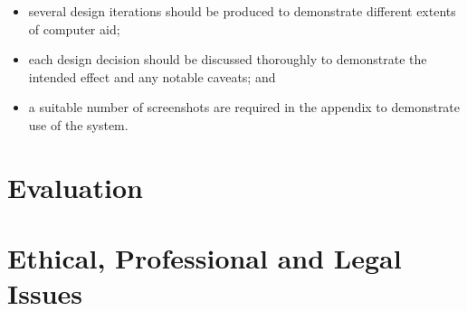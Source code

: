 \begin{itemize}
        \item several design iterations should be produced to demonstrate different extents of computer aid;
        \item each design decision should be discussed thoroughly to demonstrate the intended effect and any notable caveats; and
        \item a suitable number of screenshots are required in the appendix to demonstrate use of the system.
\end{itemize}

\section{Evaluation}

\section{Ethical, Professional and Legal Issues}

